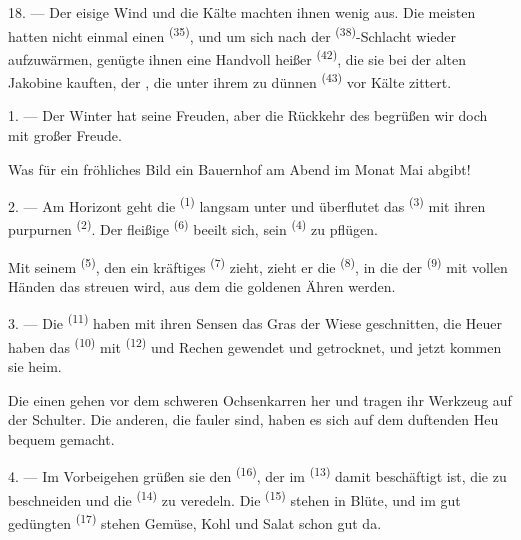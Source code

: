 18. --- Der eisige Wind und die Kälte machten ihnen wenig aus. Die meisten hatten
nicht einmal einen  \textsuperscript{(35)}, und um sich nach der
 \textsuperscript{(38)}-Schlacht wieder aufzuwärmen, genügte ihnen
eine Handvoll heißer  \textsuperscript{(42)}, die sie bei der alten
Jakobine kauften, der , die unter ihrem zu dünnen 
\textsuperscript{(43)} vor Kälte zittert.

\VUsaut{3.0mm}
\VUsaut{3.0mm}

\VUsaut{4.0mm}

1. --- Der Winter hat seine Freuden, aber die Rückkehr des 
begrüßen wir doch mit großer Freude.

Was für ein fröhliches Bild ein Bauernhof am Abend im Monat Mai abgibt!

2. --- Am Horizont geht die  \textsuperscript{(1)} langsam unter und
überflutet das  \textsuperscript{(3)} mit ihren purpurnen
 \textsuperscript{(2)}. Der fleißige 
\textsuperscript{(6)} beeilt sich, sein  \textsuperscript{(4)} zu
pflügen.

Mit seinem  \textsuperscript{(5)}, den ein kräftiges 
\textsuperscript{(7)} zieht, zieht er die  \textsuperscript{(8)}, in
die der  \textsuperscript{(9)} mit vollen Händen das 
streuen wird, aus dem die goldenen Ähren werden.

3. --- Die  \textsuperscript{(11)} haben mit ihren Sensen das Gras der
Wiese geschnitten, die Heuer haben das  \textsuperscript{(10)} mit
 \textsuperscript{(12)} und Rechen gewendet und getrocknet, und
jetzt kommen sie heim.

Die einen gehen vor dem schweren Ochsenkarren her und tragen ihr Werkzeug auf der
Schulter. Die anderen, die fauler sind, haben es sich auf dem duftenden Heu
bequem gemacht.

4. --- Im Vorbeigehen grüßen sie den  \textsuperscript{(16)}, der im
 \textsuperscript{(13)} damit beschäftigt ist, die
 zu beschneiden und die 
\textsuperscript{(14)} zu veredeln. Die 
\textsuperscript{(15)} stehen in Blüte, und im gut gedüngten 
\textsuperscript{(17)} stehen Gemüse, Kohl und Salat schon gut da.

